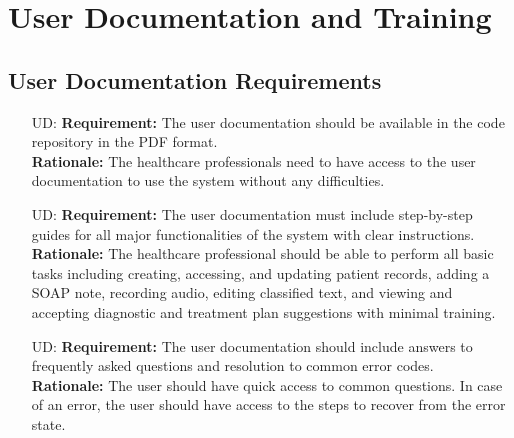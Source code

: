 \documentclass[12pt]{article}
\newcounter{udnum} %
\begin{document}
\section{User Documentation and Training}
\subsection{User Documentation Requirements}
\begin{itemize}
  \item [UD\refstepcounter{udnum}\theudnum \label{UD_doc1}:] 
  \textbf{Requirement:} The user documentation should be available in the code repository in the PDF format.\\
  \textbf{Rationale:} The healthcare professionals need to have access to the user documentation to use the system without any difficulties.\\

  \item [UD\refstepcounter{udnum}\theudnum \label{UD_doc2}:] 
  \textbf{Requirement:} The user documentation must include step-by-step guides for all major functionalities of the system with clear instructions. \\
  \textbf{Rationale:} The healthcare professional should be able to perform all basic tasks including creating, accessing, and updating patient records, adding a SOAP note, recording audio, editing classified text, and viewing and accepting diagnostic and treatment plan suggestions with minimal training.\\

  \item [UD\refstepcounter{udnum}\theudnum \label{UD_doc3}:] 
  \textbf{Requirement:} The user documentation should include answers to frequently asked questions and resolution to common error codes.\\
  \textbf{Rationale:} The user should have quick access to common questions. In case of an error, the user should have access to the steps to recover from the error state.\\ 
\end{itemize}
\end{document}
